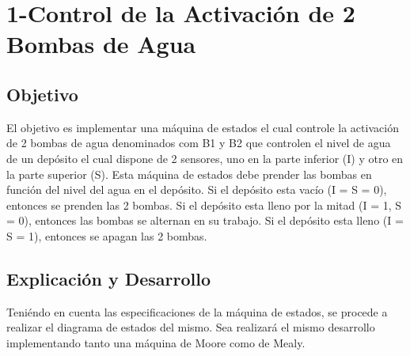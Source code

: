 \chapter*{1-Control de la Activaci\'on de 2 Bombas de Agua}
\section{Objetivo}
El objetivo es implementar una máquina de estados el cual controle la activación de 2 bombas de agua denominados com B1 y B2 que controlen el nivel de agua de un dep\'osito el cual dispone de 2 sensores, uno en la parte inferior (I) y otro en la parte superior (S).
Esta m\'aquina de estados debe prender las bombas en función del nivel del agua en el dep\'osito.
Si el dep\'osito esta vac\'io (I = S = 0), entonces se prenden las 2 bombas.
Si el dep\'osito esta lleno por la mitad (I = 1, S = 0), entonces las bombas se alternan en su trabajo.
Si el dep\'osito esta lleno (I = S = 1), entonces se apagan las 2 bombas.

\section*{Explicaci\'on y Desarrollo}
Teni\'endo en cuenta las especificaciones de la m\'aquina de estados, se procede a realizar el diagrama de estados del mismo. Sea realizará el mismo desarrollo implementando tanto una m\'aquina de Moore como de Mealy.

